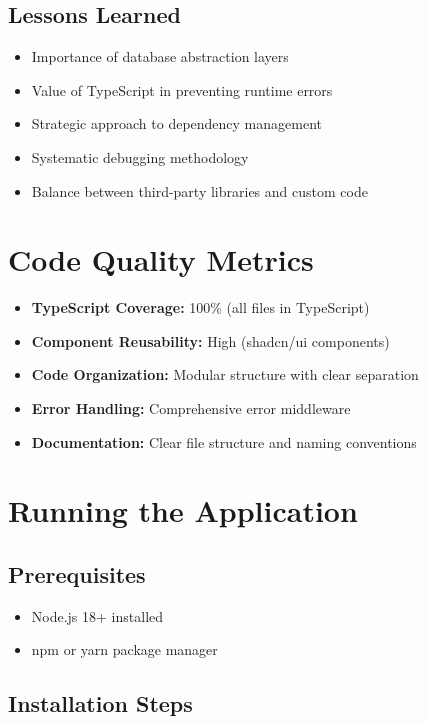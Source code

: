 \documentclass[11pt,a4paper]{article}
\begin{document}
\subsection{Lessons Learned}
\begin{itemize}[leftmargin=*]
    \item Importance of database abstraction layers
    \item Value of TypeScript in preventing runtime errors
    \item Strategic approach to dependency management
    \item Systematic debugging methodology
    \item Balance between third-party libraries and custom code
\end{itemize}

\section{Code Quality Metrics}

\begin{itemize}[leftmargin=*]
    \item \textbf{TypeScript Coverage:} 100\% (all files in TypeScript)
    \item \textbf{Component Reusability:} High (shadcn/ui components)
    \item \textbf{Code Organization:} Modular structure with clear separation
    \item \textbf{Error Handling:} Comprehensive error middleware
    \item \textbf{Documentation:} Clear file structure and naming conventions
\end{itemize}

\section{Running the Application}

\subsection{Prerequisites}
\begin{itemize}[leftmargin=*]
    \item Node.js 18+ installed
    \item npm or yarn package manager
\end{itemize}

\subsection{Installation Steps}
\end{document}
